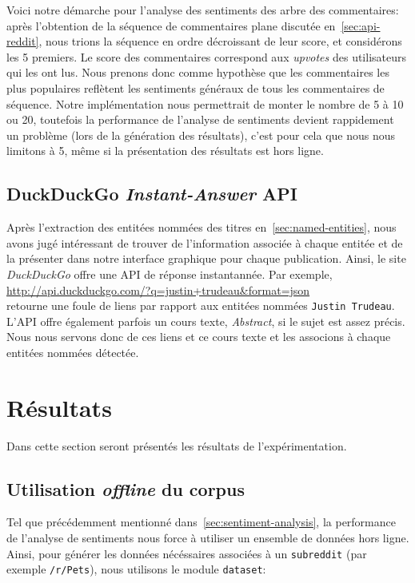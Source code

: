 \documentclass[12pt]{article}
\begin{document}
Voici notre démarche pour l'analyse des sentiments des arbre des commentaires: après l'obtention de la séquence de commentaires plane discutée en~\ref{sec:api-reddit}, nous trions la séquence en ordre décroissant de leur score, et considérons les 5 premiers. Le score des commentaires correspond aux \textit{upvotes} des utilisateurs qui les ont lus. Nous prenons donc comme hypothèse que les commentaires les plus populaires reflètent les sentiments généraux de tous les commentaires de séquence. Notre implémentation nous permettrait de monter le nombre de 5 à 10 ou 20, toutefois la performance de l'analyse de sentiments devient rappidement un problème (lors de la génération des résultats), c'est pour cela que nous nous limitons à 5, même si la présentation des résultats est hors ligne.

\subsection{DuckDuckGo \textit{Instant-Answer} API}

Après l'extraction des entitées nommées des titres en~\ref{sec:named-entities}, nous avons jugé intéressant de trouver de l'information associée à chaque entitée et de la présenter dans notre interface graphique pour chaque publication. Ainsi, le site \textit{DuckDuckGo} offre une API de réponse instantannée. Par exemple,\\

\url{http://api.duckduckgo.com/?q=justin+trudeau&format=json}\\

retourne une foule de liens par rapport aux entitées nommées \verb;Justin Trudeau;. L'API offre également parfois un cours texte, \textit{Abstract}, si le sujet est assez précis. Nous nous servons donc de ces liens et ce cours texte et les associons à chaque entitées nommées détectée.

\section{Résultats}

Dans cette section seront présentés les résultats de l'expérimentation.

\subsection{Utilisation \textit{offline} du corpus}
Tel que précédemment mentionné dans~\ref{sec:sentiment-analysis}, la performance de l'analyse de sentiments nous force à utiliser un ensemble de données hors ligne. Ainsi, pour générer les données nécéssaires associées à un \verb;subreddit; (par exemple \verb;/r/Pets;), nous utilisons le module \verb;dataset;:
\end{document}
